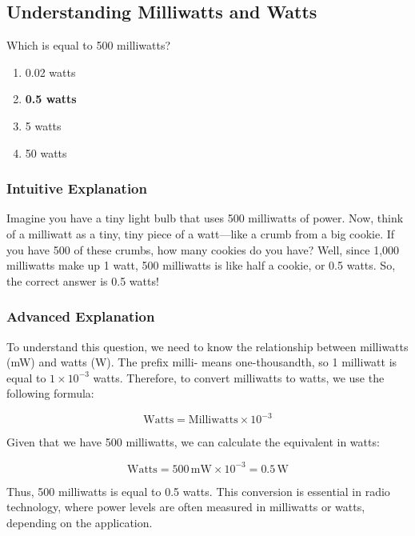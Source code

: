 \subsection{Understanding Milliwatts and Watts}
\label{T5B05}

\begin{tcolorbox}[colback=gray!10!white,colframe=black!75!black,title=T5B05]
Which is equal to 500 milliwatts?
\begin{enumerate}[label=\Alph*)]
    \item 0.02 watts
    \item \textbf{0.5 watts}
    \item 5 watts
    \item 50 watts
\end{enumerate}
\end{tcolorbox}

\subsubsection{Intuitive Explanation}
Imagine you have a tiny light bulb that uses 500 milliwatts of power. Now, think of a milliwatt as a tiny, tiny piece of a watt—like a crumb from a big cookie. If you have 500 of these crumbs, how many cookies do you have? Well, since 1,000 milliwatts make up 1 watt, 500 milliwatts is like half a cookie, or 0.5 watts. So, the correct answer is 0.5 watts!

\subsubsection{Advanced Explanation}
To understand this question, we need to know the relationship between milliwatts (mW) and watts (W). The prefix milli- means one-thousandth, so 1 milliwatt is equal to \(1 \times 10^{-3}\) watts. Therefore, to convert milliwatts to watts, we use the following formula:

\[
\text{Watts} = \text{Milliwatts} \times 10^{-3}
\]

Given that we have 500 milliwatts, we can calculate the equivalent in watts:

\[
\text{Watts} = 500 \, \text{mW} \times 10^{-3} = 0.5 \, \text{W}
\]

Thus, 500 milliwatts is equal to 0.5 watts. This conversion is essential in radio technology, where power levels are often measured in milliwatts or watts, depending on the application.

